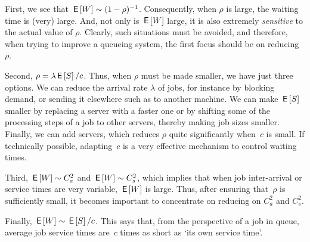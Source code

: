 \documentclass[queueing-book.tex]{subfiles}
\begin{document}
First, we see that $\,\mathsf{E}\left[W\right] \sim (1-\rho)^{-1}$.
Consequently, when $\rho$ is large, the waiting time is (very) large. And,
not only is $\,\mathsf{E}\left[W\right]$ large, it is also extremely \emph{sensitive} to the actual value of $\rho$.
Clearly, such situations must be avoided, and therefore, when trying to improve a queueing system, the first focus should be on reducing~$\rho$.

Second, $\rho = \lambda \,\mathsf{E}\left[S\right]/c$.
Thus, when $\rho$ must be made smaller, we have just three options.
We can reduce the arrival rate $\lambda$ of jobs, for instance by blocking demand, or sending it elsewhere such as to another machine.
We can make $\,\mathsf{E}\left[S\right]$ smaller by replacing a server with a faster one or by shifting some of the processing steps of a job to other servers, thereby making job sizes smaller.
Finally, we can add servers, which reduces $\rho$ quite significantly when~$c$ is small.
If technically possible, adapting~$c$ is a very effective mechanism to control waiting times.

Third, $\,\mathsf{E}\left[W\right] \sim C_a^2$ and $\,\mathsf{E}\left[W\right] \sim C_s^2$, which implies that when job inter-arrival or service times are very variable, $\,\mathsf{E}\left[W\right]$ is large.
Thus, after ensuring that~$\rho$ is sufficiently small, it becomes important to concentrate on reducing on $C_a^2$ and $C_s^2$.

Finally, $\,\mathsf{E}\left[W\right] \sim \,\mathsf{E}\left[S\right]/c$.
This says that, from the perspective of a job in queue, average job service times are~$c$ times as short as `its own service time'.



\end{document}
